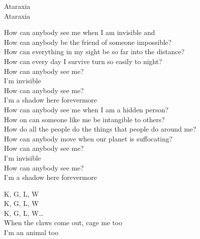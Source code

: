 Ataraxia \\
Ataraxia \\




How can anybody see me when I am invisible and \\
How can anybody be the friend of someone impossible? \\
How can everything in my sight be so far into the distance? \\
How can every day I survive turn so easily to night? \\

How can anybody see me? \\
I'm invisible \\
How can anybody see me? \\
I'm a shadow here forevermore \\

How can anybody see me when I am a hidden person? \\
How on  can someone like me be intangible to others? \\
How do all the people do the things that people do around me? \\
How can anybody move when our planet is suffocating? \\

How can anybody see me? \\
I'm invisible \\
How can anybody see me? \\
I'm a shadow here forevermore \\




K, G, L, W \\
K, G, L, W \\
K, G, L, W… \\

When the claws come out, cage me too \\
I'm an animal too \\
